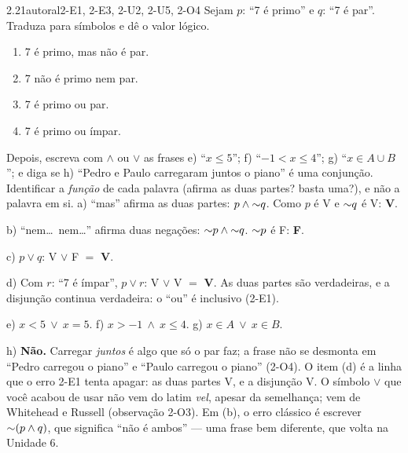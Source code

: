 \begin{exemplo}{2.2}{1}{autoral}{2-E1, 2-E3, 2-U2, 2-U5, 2-O4}\label{ex:2.2}
Sejam $p$: \enquote{7 é primo} e $q$: \enquote{7 é par}. Traduza para símbolos e dê o valor lógico.
\begin{enumerate}[label=\alph*)]
  \item 7 é primo, mas não é par.
  \item 7 não é primo nem par.
  \item 7 é primo ou par.
  \item 7 é primo ou ímpar.
\end{enumerate}
Depois, escreva com $\wedge$ ou $\vee$ as frases e) \enquote{$x\le 5$}; f) \enquote{$-1<x\le 4$}; g) \enquote{$x\in A\cup B$}; e diga se h) \enquote{Pedro e Paulo carregaram juntos o piano} é uma conjunção.
\plano Identificar a \emph{função} de cada palavra (afirma as duas partes? basta uma?), e não a palavra em si.
\resolucao
a) \enquote{mas} afirma as duas partes: $p\wedge{{\sim}}q$. Como $p$ é V e ${{\sim}}q$ é V: \textbf{V}.
\par b) \enquote{nem\ldots\ nem\ldots} afirma duas negações: ${{\sim}}p\wedge{{\sim}}q$. ${{\sim}}p$ é F: \textbf{F}.
\par c) $p\vee q$: V $\vee$ F $=$ \textbf{V}.
\par d) Com $r$: \enquote{7 é ímpar}, $p\vee r$: V $\vee$ V $=$ \textbf{V}. As duas partes são verdadeiras, e a disjunção continua verdadeira: o \enquote{ou} é inclusivo (2-E1).
\par e) $x<5\ \vee\ x=5$. \quad f) $x>-1\ \wedge\ x\le 4$. \quad g) $x\in A\ \vee\ x\in B$.
\par h) \textbf{Não.} Carregar \emph{juntos} é algo que só o par faz; a frase não se desmonta em \enquote{Pedro carregou o piano} e \enquote{Paulo carregou o piano} (2-O4).
\comentario O item (d) é a linha que o erro 2-E1 tenta apagar: as duas partes V, e a disjunção V. O símbolo $\vee$ que você acabou de usar não vem do latim \emph{vel}, apesar da semelhança; vem de Whitehead e Russell (observação 2-O3). Em (b), o erro clássico é escrever ${{\sim}}(p\wedge q)$, que significa \enquote{não é ambos} — uma frase bem diferente, que volta na Unidade 6.
\end{exemplo}

